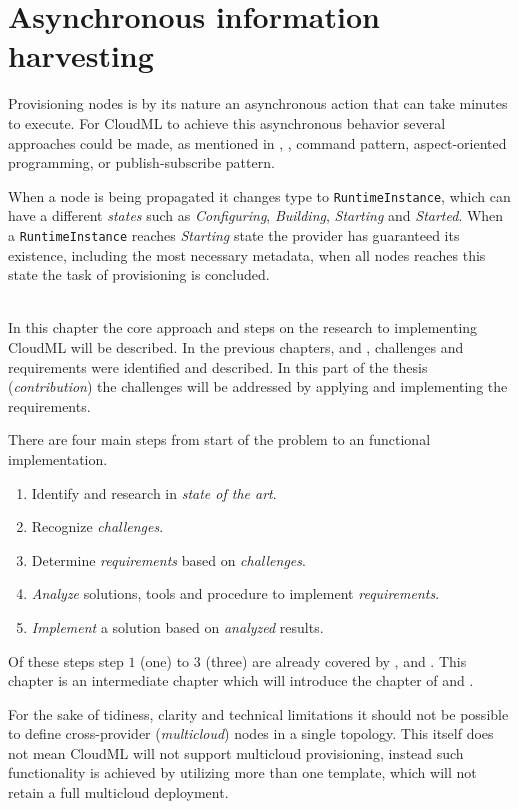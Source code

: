 \section{Asynchronous information harvesting}

Provisioning nodes is by its nature an asynchronous action that can take minutes to execute.
For CloudML to achieve this asynchronous behavior several approaches could be made,
as mentioned in , \eg, command pattern, aspect-oriented programming,
or publish-subscribe pattern.

When a node is being propagated it changes type to \texttt{RuntimeInstance}, 
which can have a different \emph{states} such as \emph{Configuring}, \emph{Building}, \emph{Starting} and \emph{Started}.
When a \texttt{RuntimeInstance} reaches \emph{Starting} state the provider has guaranteed its existence, including
the most necessary metadata, when all nodes reaches this state the task of provisioning is concluded.

\hr 

 \\
In this chapter the core approach and steps on the research to implementing CloudML will be described.
In the previous chapters,  and , 
challenges and requirements were identified and described.
In this part of the thesis (\emph{contribution}) the challenges will be addressed 
by applying and implementing the requirements.

There are four main steps from start of the problem to an functional implementation.
\begin{enumerate}
  \item Identify and research in \emph{state of the art}.
  \item Recognize \emph{challenges}.
  \item Determine \emph{requirements} based on \emph{challenges}.
  \item \emph{Analyze} solutions, tools and procedure to implement \emph{requirements}.
  \item \emph{Implement} a solution based on \emph{analyzed} results.
\end{enumerate}
Of these steps step $1$ (one) to $3$ (three) are already covered by 
,  and .
This chapter is an intermediate chapter which will introduce the chapter of 
and .


For the sake of tidiness, clarity and technical limitations it 
should not be possible to define cross-provider (\emph{multicloud}) nodes in a single topology.
This itself does not mean CloudML will not support multicloud provisioning,
instead such functionality is achieved by utilizing more than one template,
which will not retain a full multicloud deployment.
